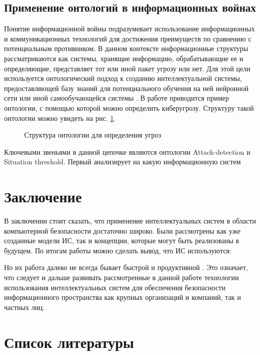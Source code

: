 \subsection{Применение онтологий в информационных войнах}
Понятие информационной войны подразумевает использование информационных и коммуникационных
технологий для достижения преимуществ по сравнению с потенциальным противником. В данном контексте
информационные структуры рассматриваются как системы, хранящие информацию, обрабатывающие ее и определяющие,
представляет тот или иной пакет угрозу или нет. Для этой цели используется онтологический подход к созданию
интеллектуальной системы, предоставляющей базу знаний для потенциального обучения на ней нейронной сети
или иной самообучающейся системы \cite{wars}. В работе \cite{wars} приводится пример онтологии, с помощью которой
можно определить киберугрозу. Структуру такой онтологии можно увидеть на рис. \ref{ont}.

\begin{figure}[h]
    \caption{Структура онтологии для определения угроз \cite{wars}}
    \label{ont}
\end{figure}

Ключевыми звеньями в данной цепочке являются онтологии Attack-detection и Situation threshold.
Первый анализирует на какую информационную систем


\section{Заключение}
В заключении стоит сказать, что применение интеллектуальных систем в области компьютерной безопасности
достаточно широко. Были рассмотрены как уже созданные модели ИС, так и концепции, которые могут
быть реализованы в будущем. По итогам работы можно сделать вывод, что ИС используются:


Но их работа далеко не всегда бывает быстрой и продуктивной \cite{mob, upg}. Это означает,
что следует и дальше развивать рассмотренные в данной работе технологии использования интеллектуальных
систем для обеспечения безопасности информационного пространства как крупных организаций и компаний, так
и частных лиц.
\newpage

\section{Список литературы}
\medskip

